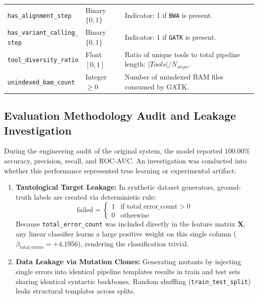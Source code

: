 \documentclass[12pt,a4paper]{article}
\begin{document}
\begin{table}[H]
\begin{tabularx}{\textwidth}{p{5.0cm}p{1.8cm}X}
\texttt{has\_alignment\_step} & \makecell[c]{Binary\\$\{0,1\}$} & Indicator: 1 if \texttt{BWA} is present. \\
\makecell[l]{\texttt{has\_variant\_calling\_}\\\texttt{step}} & \makecell[c]{Binary\\$\{0,1\}$} & Indicator: 1 if \texttt{GATK} is present. \\
\texttt{tool\_diversity\_ratio} & Float $[0, 1]$ & Ratio of unique tools to total pipeline length: $|Tools| / N_{steps}$. \\
\texttt{unindexed\_bam\_count} & Integer $\ge 0$ & Number of unindexed BAM files consumed by GATK. \\
\bottomrule
\end{tabularx}
\end{table}

\subsection{Evaluation Methodology Audit and Leakage Investigation}

During the engineering audit of the original system, the model reported $100.00\%$ accuracy, precision, recall, and ROC-AUC. An investigation was conducted into whether this performance represented true learning or experimental artifact:
\begin{enumerate}
    \item \textbf{Tautological Target Leakage:} In synthetic dataset generators, ground-truth labels are created via deterministic rule:
    \begin{equation}
        \text{failed} = \begin{cases}
            1 & \text{if } \text{total\_error\_count} > 0 \\
            0 & \text{otherwise}
        \end{cases}
    \end{equation}
    Because \texttt{total\_error\_count} was included directly in the feature matrix $\mathbf{X}$, any linear classifier learns a large positive weight on this single column ($\beta_{\text{total\_errors}} = +4.1956$), rendering the classification trivial.
    \item \textbf{Data Leakage via Mutation Clones:} Generating mutants by injecting single errors into identical pipeline templates results in train and test sets sharing identical syntactic backbones. Random shuffling (\texttt{train\_test\_split}) leaks structural templates across splits.
\end{enumerate}
\end{document}
